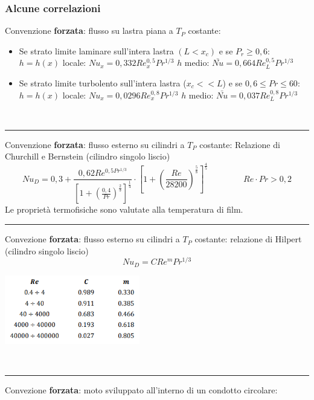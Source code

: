 \subsubsection{Alcune correlazioni}
Convenzione \textbf{forzata}: flusso su lastra piana a $T_P$  costante:
\begin{itemize}
    \item Se strato limite laminare sull'intera lastra $(L<x_c)$ e se $P_r \geq 0,6$:\newline
    $h = h(x)$ locale: $Nu_x = 0,332 Re_x^{0,5}Pr^{1/3}$\newline
    $h$ medio: $\bar{Nu} = 0,664Re_L^{0,5}Pr^{1/3}$
    \item Se strato limite turbolento sull'intera lastra ($x_c << L$) e se $0,6 \leq Pr \leq 60$:\newline
    $h = h(x)$ locale: $Nu_x = 0,0296Re_x^{0,8} Pr^{1/3}$\newline
    $h$ medio: $\bar{Nu} = 0,037 Re_L^{0,8} Pr^{1/3}$
\end{itemize}
\ \newline
\rule{\textwidth}{0,4pt}
Convenzione \textbf{forzata}: flusso esterno su cilindri a $T_P$ costante:\newline
Relazione di Churchill e Bernstein (cilindro singolo liscio)
\[
    Nu_D = 0,3 + \frac{0,62Re^{0,5Pr^{1/3}}}{\left[1 + \left(\frac{0,4}{Pr}\right)^{\frac{2}{3}}\right]^{\frac{1}{4}}}\cdot \left[1 + \left(\frac{Re}{28200}\right)^{\frac{5}{8}}\right]^{\frac{4}{5}}\;\;\;\;\;\;\;\;\;\;\;\;\;\;\;Re \cdot Pr > 0,2
\]
Le proprietà termofisiche sono valutate alla temperatura di film.\newline
\newline
\rule{\textwidth}{0,4pt}
Convezione \textbf{forzata}: flusso esterno su cilindri a $T_P$ costante:\newline
relazione di Hilpert (cilindro singolo liscio)
\[
    Nu_D = C Re^m Pr^{1/3}
\]
\begin{center}
    \includegraphics[height=3cm]{../L11/img2.PNG}
\end{center}
\ \newline
\rule{\textwidth}{0,4pt}
Convezione \textbf{forzata}: moto sviluppato all'interno di un condotto circolare:\newline
